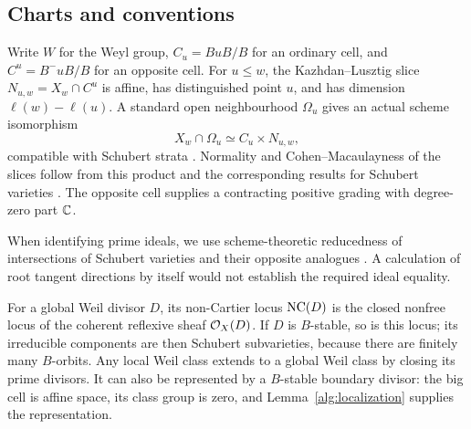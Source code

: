 \subsection{Charts and conventions}\label{sec:charts}
Write $W$ for the Weyl group, $C_u=BuB/B$ for an ordinary cell, and $C^u=B^-uB/B$ for an opposite cell. For $u\le w$, the Kazhdan--Lusztig slice $N_{u,w}=X_w\cap C^u$ is affine, has distinguished point $u$, and has dimension $\ell(w)-\ell(u)$. A standard open neighbourhood $\Omega_u$ gives an actual scheme isomorphism
\[
 X_w\cap\Omega_u\simeq C_u\times N_{u,w},
\]
compatible with Schubert strata \cite[Lemma~3.2]{WY08}\cite[Lemma~2.1]{KWY13}. Normality and Cohen--Macaulayness of the slices follow from this product and the corresponding results for Schubert varieties \cite[Theorems~2.1.1, 2.2.3 and Proposition~2.2.5]{Bri05}. The opposite cell supplies a contracting positive grading with degree-zero part $\mathbb C$.

When identifying prime ideals, we use scheme-theoretic reducedness of intersections of Schubert varieties and their opposite analogues \cite{Ram87}\cite[Section~2]{Kum17}. A calculation of root tangent directions by itself would not establish the required ideal equality.

For a global Weil divisor $D$, its non-Cartier locus $\operatorname{NC}(D)$ is the closed nonfree locus of the coherent reflexive sheaf $\mathcal O_X(D)$. If $D$ is $B$-stable, so is this locus; its irreducible components are then Schubert subvarieties, because there are finitely many $B$-orbits. Any local Weil class extends to a global Weil class by closing its prime divisors. It can also be represented by a $B$-stable boundary divisor: the big cell is affine space, its class group is zero, and Lemma~\ref{alg:localization} supplies the representation.
